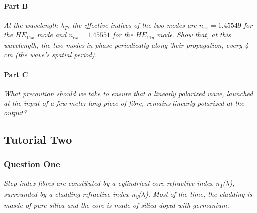 \documentclass[colorlinks,11pt,a4paper,normalphoto,withhyper,ragged2e]{altareport}
\begin{document}
\paragraph{Part B \linebreak}
\textit{At the wavelength $\lambda_T$, the effective indices of the two modes are $n_{ex}=1.45549$ for the $HE_{11x}$ mode and $n_{ex}=1.45551$ for the $HE_{11y}$ mode. Show that, at this wavelength, the two modes in phase periodically along their propagation, every 4 cm (the wave's spatial period).} \linebreak




\paragraph{Part C \linebreak}
\textit{What precaution should we take to ensure that a linearly polarized wave, launched at the input of a few meter long piece of fibre, remains linearly polarized at the output?} \linebreak




\newpage




\subsection{Tutorial Two}
\subsubsection{Question One}
\textit{Step index fibres are constituted by a cylindrical core refractive index n\textsubscript{1}($\lambda$), surrounded by a cladding refractive index n\textsubscript{2}($\lambda$). Most of the time, the cladding is masde of pure silica and the core is made of silica doped with germanium.} \\




\newpage




\newpage
{}  %


\end{document}
